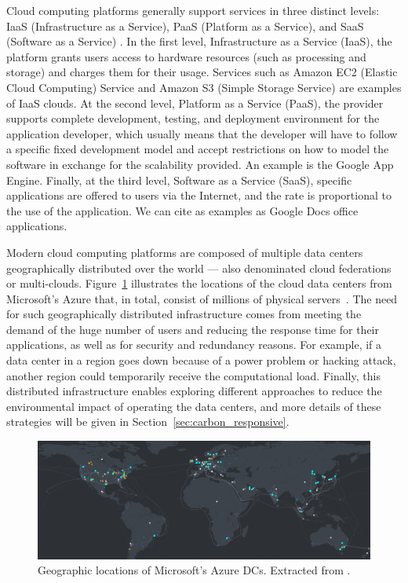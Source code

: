Cloud computing platforms generally support services in three distinct levels: IaaS (Infrastructure as a Service), PaaS (Platform as a Service), and SaaS (Software as a Service) \citep{fos08}. In the first level, Infrastructure as a Service (IaaS), the platform grants users access to hardware resources (such as processing and storage) and charges them for their usage. Services such as Amazon EC2 (Elastic Cloud Computing) Service and Amazon S3 (Simple Storage Service) are examples of IaaS clouds.   At the second level, Platform as a Service (PaaS), the provider supports complete development, testing, and deployment environment for the application developer, which usually means that the developer will have to follow a specific fixed development model and accept restrictions on how to model the software in exchange for the scalability provided. An example is the Google App Engine. Finally, at the third level, Software as a Service (SaaS), specific applications are offered to users via the Internet, and the rate is proportional to the use of the application. We can cite as examples as Google Docs office applications.

Modern cloud computing platforms are composed of multiple data centers geographically distributed over the world --- also denominated cloud federations or multi-clouds. Figure~\ref{fig:dc_locations} illustrates the locations of the cloud data centers from Microsoft's Azure that, in total, consist of millions of physical servers~\cite{roach2021_microsoftazure}. The need for such geographically distributed infrastructure comes from meeting the demand of the huge number of users and reducing the response time for their applications, as well as for security and redundancy reasons. For example, if a data center in a region goes down because of a power problem or hacking attack, another region could temporarily receive the computational load. Finally, this distributed infrastructure enables exploring different approaches to reduce the environmental impact of operating the data centers, and more details of these strategies will be given in Section~\ref{sec:carbon_responsive}.


\begin{figure}[h]
\centering
  \includegraphics[width=\linewidth]{images/azure_cloud_infra.png}
  \caption{Geographic locations of Microsoft's Azure DCs. Extracted from \cite{azure_dcs_location}.}
  \label{fig:dc_locations}
\end{figure}


